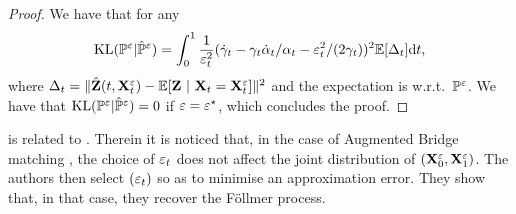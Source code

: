 \documentclass{article}
\begin{document}
\begin{proof}
We have that for any 
\begin{equation}
 \mathrm{KL}(\mathbb{P}^\varepsilon | \hat{\mathbb{P}}^\varepsilon) = \int_0^1 \frac{1}{\varepsilon_t^2}(\dot{\gamma}_t - \gamma_t \dot{\alpha}_t/\alpha_t -  \varepsilon_t^2 /(2\gamma_t))^2 \mathbb{E}[\Delta_t] \mathrm{d} t,
\end{equation}
where $\Delta_t = \| \hat{\mathbf{Z}}(t, \mathbf{X}_t^\varepsilon) - \mathbb{E}[\mathbf{Z} \ | \ \mathbf{X}_t = \mathbf{X}_t^\varepsilon]\|^2$ and the expectation is w.r.t.~$\mathbb{P}^\varepsilon$. We have that  $\mathrm{KL}(\mathbb{P}^\varepsilon | \hat{\mathbb{P}}^\varepsilon) =0 $ if $\varepsilon = \varepsilon^\star$, which concludes the proof.
\end{proof}

 is related to \cite[Section 3.4]{chen2024probabilistic}. Therein it is noticed that, in the case of Augmented Bridge matching \citep{debortoli2023augmented}, the choice of $\varepsilon_t$ does not affect the joint distribution of $(\mathbf{X}_0^\varepsilon, \mathbf{X}_1^\varepsilon)$. The authors then select $(\varepsilon_t)$ so as to minimise an approximation error. They show that, in that case, they recover the F\"ollmer process.
\end{document}
